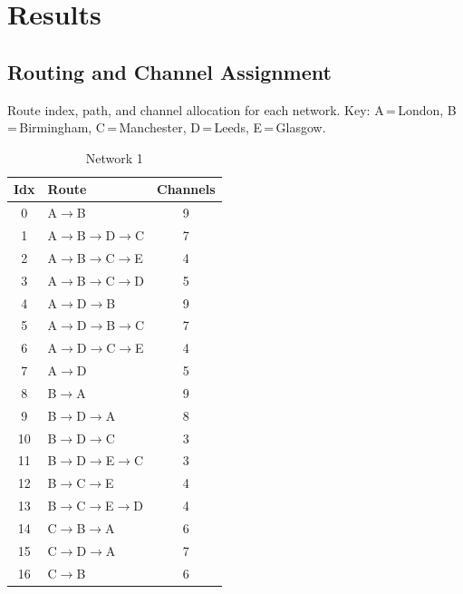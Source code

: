\documentclass[12pt,a4paper]{article}
\begin{document}
\section{Results}

\newcommand{\ra}{$\rightarrow$}
\subsection{Routing and Channel Assignment}

\begin{table}[H]
\centering
\caption{Route index, path, and channel allocation for each network.
  Key: A\,=\,London, B\,=\,Birmingham, C\,=\,Manchester, D\,=\,Leeds, E\,=\,Glasgow.}
\label{tab:routes}
\begin{subtable}[t]{0.48\textwidth}
\centering
\caption{Network 1}
\begin{tabular}{clc}
\toprule
Idx & Route & Channels \\
\midrule
0  & A\ra B                    & 9  \\
1  & A\ra B\ra D\ra C          & 7  \\
2  & A\ra B\ra C\ra E          & 4  \\
3  & A\ra B\ra C\ra D          & 5  \\
4  & A\ra D\ra B               & 9  \\
5  & A\ra D\ra B\ra C          & 7  \\
6  & A\ra D\ra C\ra E          & 4  \\
7  & A\ra D                    & 5  \\
8  & B\ra A                    & 9  \\
9  & B\ra D\ra A               & 8  \\
10 & B\ra D\ra C               & 3  \\
11 & B\ra D\ra E\ra C          & 3  \\
12 & B\ra C\ra E               & 4  \\
13 & B\ra C\ra E\ra D          & 4  \\
14 & C\ra B\ra A               & 6  \\
15 & C\ra D\ra A               & 7  \\
16 & C\ra B                    & 6  \\

\end{tabular}
\end{subtable}
\end{table}
\end{document}
